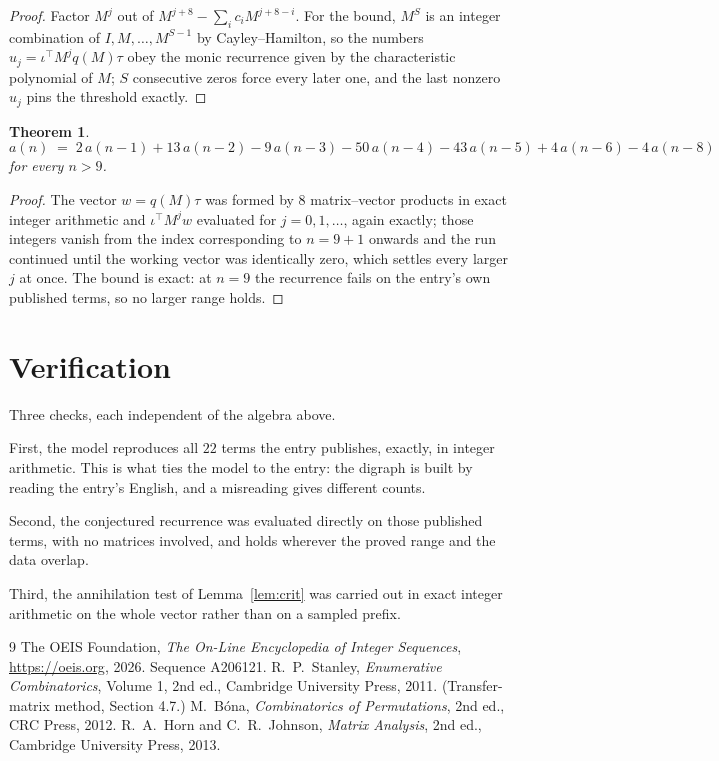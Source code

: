 \documentclass[11pt,a4paper]{article}
\theoremstyle{plain}
\newtheorem{theorem}{Theorem}
\theoremstyle{definition}
\begin{document}
\begin{proof}
Factor $M^{j}$ out of $M^{j+8}-\sum_ic_iM^{j+8-i}$. For the bound, $M^{S}$
is an integer combination of $I,M,\dots,M^{S-1}$ by Cayley--Hamilton, so the numbers
$u_j=\iota^{\!\top}M^{j}q(M)\tau$ obey the monic recurrence given by the characteristic
polynomial of $M$; $S$ consecutive zeros force every later one, and the last nonzero $u_j$
pins the threshold exactly.
\end{proof}

\begin{theorem}
\[
a(n)\;=\;2\,a(n-1) + 13\,a(n-2) - 9\,a(n-3) - 50\,a(n-4) - 43\,a(n-5) + 4\,a(n-6) - 4\,a(n-8)
\]
for every $n>9$.
\end{theorem}

\begin{proof}
The vector $w=q(M)\tau$ was formed by $8$ matrix--vector products in exact integer
arithmetic and $\iota^{\!\top}M^{j}w$ evaluated for $j=0,1,\dots$, again exactly; those
integers vanish from the index corresponding to $n=9+1$ onwards and the run continued
until the working vector was identically zero, which settles every larger $j$ at once. The bound is exact: at $n=9$ the recurrence fails on the entry's own published terms, so no larger range holds.
\end{proof}

\section{Verification}

Three checks, each independent of the algebra above.

First, the model reproduces all $22$ terms the entry publishes, exactly, in integer
arithmetic. This is what ties the model to the entry: the digraph is built by reading the
entry's English, and a misreading gives different counts.

Second, the conjectured recurrence was evaluated directly on those published terms, with no
matrices involved, and holds wherever the proved range and the data overlap.

Third, the annihilation test of Lemma~\ref{lem:crit} was carried out in exact integer
arithmetic on the whole vector rather than on a sampled prefix.

\begin{thebibliography}{9}
 The OEIS Foundation, \emph{The On-Line Encyclopedia of Integer
Sequences}, \url{https://oeis.org}, 2026. Sequence A206121.
 R.~P.~Stanley, \emph{Enumerative Combinatorics}, Volume 1, 2nd ed.,
Cambridge University Press, 2011. (Transfer-matrix method, Section 4.7.)
 M.~B\'ona, \emph{Combinatorics of Permutations}, 2nd ed., CRC
Press, 2012.
 R.~A.~Horn and C.~R.~Johnson, \emph{Matrix Analysis}, 2nd ed., Cambridge
University Press, 2013.
\end{thebibliography}
\end{document}
